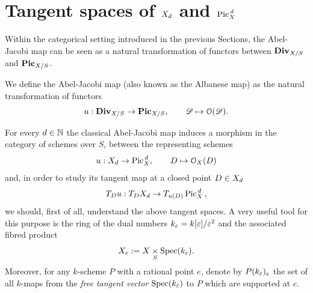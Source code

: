 \section{Tangent spaces of $X_d$ and $\operatorname{Pic}^{\,d}_X$ }\label{sec:tgnt_spaces}
	Within the categorical setting introduced in the previous Sections, the Abel-Jacobi map can be seen as a natural transformation of functors between $\operatorname{\mathbf{Div}}_{X/S}$ and $\operatorname{\mathbf{Pic}}_{X/S}$.
	\begin{defi}
		We define the Abel-Jacobi map (also known as the Albanese map) as the natural transformation of functors
		$$ u: \operatorname{\mathbf{Div}}_{X/S} \to \operatorname{\mathbf{Pic}}_{X/S}, \qquad \mathscr{D} \mapsto \mathcal{O}(\mathscr{D}).$$
	\end{defi}
	For every $d\in \mathbb{N}$ the classical Abel-Jacobi map induces a morphism in the category of schemes over $S$, between the representing schemes
	$$ u :  X_d \to \operatorname{Pic}^{\,d}_X, \qquad D \mapsto \mathcal{O}_X(D) $$
	and, in order to study its tangent map at a closed point $D\in X_d$
	$$ T_D u : T_D X_d \to T_{u(D)} \operatorname{Pic}^{\,d}_X \,, $$
	we should, first of all, understand the above tangent spaces. A very useful tool for this purpose is the ring of the dual numbers $ k_\varepsilon = k[\varepsilon]/\varepsilon^2 $ and the associated fibred product 
	$$ X_\varepsilon := X \underset{{S}}\times {\operatorname{Spec}(k_\varepsilon)}. $$ 
	Moreover, for any $k$-scheme $P$ with a rational point $e$, denote by $P(k_\varepsilon)_e$ the set of all $k$-maps from the \emph{free tangent vector} $\operatorname{Spec}(k_\varepsilon)$ to $P$ which are supported at $e$. \\

